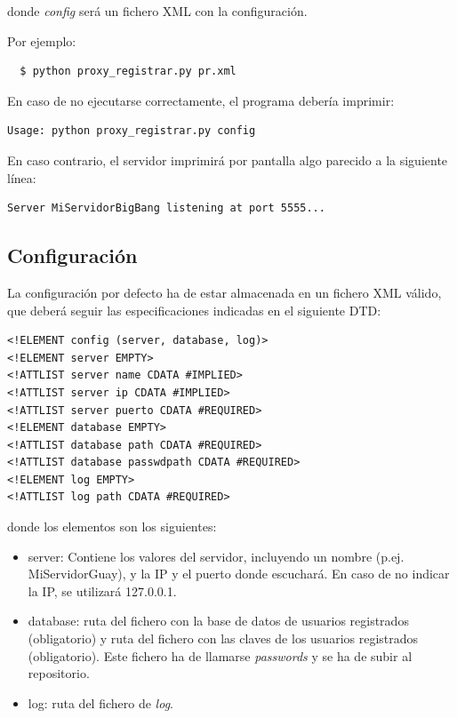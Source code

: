 \documentclass[a4paper,11pt]{article}
\begin{document}
donde \emph{config} será un fichero XML con la configuración.

Por ejemplo:
\begin{verbatim}
  $ python proxy_registrar.py pr.xml
\end{verbatim}

En caso de no ejecutarse correctamente, el programa debería imprimir:
\begin{verbatim}
Usage: python proxy_registrar.py config
\end{verbatim}

En caso contrario, el servidor imprimirá por pantalla algo parecido a la siguiente línea:
\begin{verbatim}
Server MiServidorBigBang listening at port 5555...
\end{verbatim}


\subsection{Configuración}

  La configuración por defecto ha de estar almacenada en un fichero XML válido, que deberá seguir las especificaciones indicadas en el siguiente DTD:

\begin{verbatim}
<!ELEMENT config (server, database, log)>
<!ELEMENT server EMPTY>
<!ATTLIST server name CDATA #IMPLIED>
<!ATTLIST server ip CDATA #IMPLIED>
<!ATTLIST server puerto CDATA #REQUIRED>
<!ELEMENT database EMPTY>
<!ATTLIST database path CDATA #REQUIRED>
<!ATTLIST database passwdpath CDATA #REQUIRED>
<!ELEMENT log EMPTY>
<!ATTLIST log path CDATA #REQUIRED>
\end{verbatim}

donde los elementos son los siguientes:

\begin{itemize}
  \item server: Contiene los valores del servidor, incluyendo un nombre (p.ej. MiServidorGuay), y la IP y el puerto donde escuchará. En caso de no indicar la IP, se utilizará 127.0.0.1.
  \item database: ruta del fichero con la base de datos de usuarios registrados (obligatorio) y ruta del fichero con las claves de los usuarios registrados (obligatorio). Este fichero ha de llamarse \emph{passwords} y se ha de subir al repositorio.
  \item log: ruta del fichero de \emph{log}.
\end{itemize}
\end{document}
